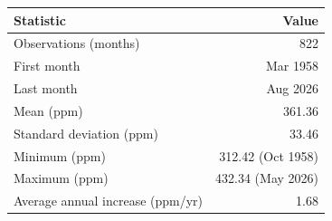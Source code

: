 
\begin{tabular}[t]{lr}
\toprule
Statistic & Value\\
\midrule
Observations (months) & 822\\
First month & Mar 1958\\
Last month & Aug 2026\\
Mean (ppm) & 361.36\\
Standard deviation (ppm) & 33.46\\
Minimum (ppm) & 312.42 (Oct 1958)\\
Maximum (ppm) & 432.34 (May 2026)\\
Average annual increase (ppm/yr) & 1.68\\
\bottomrule
\end{tabular}
